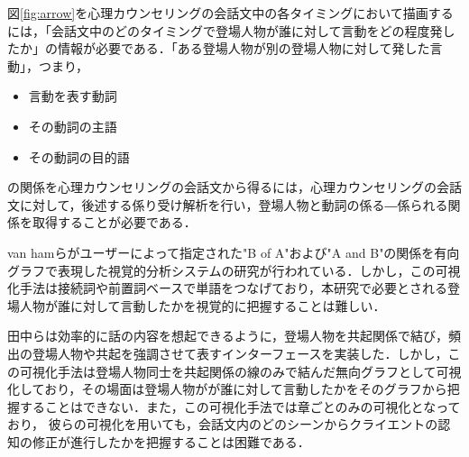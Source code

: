 \documentclass[shuuron]{kuee}
\begin{document}
%


図\ref{fig:arrow}を心理カウンセリングの会話文中の各タイミングにおいて描画するには，「会話文中のどのタイミングで登場人物が誰に対して言動をどの程度発したか」の情報が必要である．「ある登場人物が別の登場人物に対して発した言動」，つまり，
\begin{itemize}
  \item 言動を表す動詞
  \item その動詞の主語
  \item その動詞の目的語
\end{itemize}
の関係を心理カウンセリングの会話文から得るには，心理カウンセリングの会話文に対して，後述する係り受け解析を行い，登場人物と動詞の係る―係られる関係を取得することが必要である．

van hamら\cite{van2009mapping}がユーザーによって指定された"B of A"および"A and B"の関係を有向グラフで表現した視覚的分析システムの研究が行われている．しかし，この可視化手法は接続詞や前置詞ベースで単語をつなげており，本研究で必要とされる登場人物が誰に対して言動したかを視覚的に把握することは難しい．

田中ら\cite{tanaka}は効率的に話の内容を想起できるように，登場人物を共起関係で結び，頻出の登場人物や共起を強調させて表すインターフェースを実装した．しかし，この可視化手法は登場人物同士を共起関係の線のみで結んだ無向グラフとして可視化しており，その場面は登場人物がが誰に対して言動したかをそのグラフから把握することはできない．また，この可視化手法では章ごとのみの可視化となっており， 彼らの可視化を用いても，会話文内のどのシーンからクライエントの認知の修正が進行したかを把握することは困難である．
\end{document}
